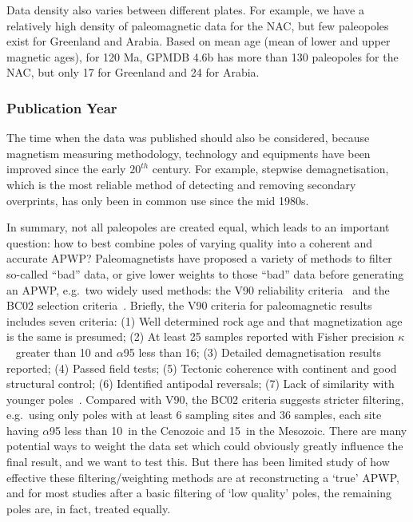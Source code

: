 Data density also varies between different plates. For example, we have a
relatively high density of paleomagnetic data for the NAC, but few paleopoles
exist for Greenland and Arabia. Based on mean age (mean of lower and upper
magnetic ages), for 120 Ma, GPMDB 4.6b has more than 130 paleopoles
for the NAC, but only 17 for Greenland and 24 for Arabia.

\subsubsection{Publication Year}\label{sec:puby}

The time when the data was published should also be considered, because
magnetism measuring methodology, technology and equipments have been improved
since the early $20^{th}$ century. For example, stepwise demagnetisation, which
is the most reliable method of detecting and removing secondary overprints, has
only been in common use since the mid 1980s.

In summary, not all paleopoles are created equal, which leads to an important
question: how to best combine poles of varying quality into a coherent and
accurate APWP\@? Paleomagnetists have proposed a variety of methods to filter
so-called ``bad'' data, or give lower weights to those ``bad'' data before
generating an APWP, e.g.\ two widely used methods: the V90 reliability
criteria~\citep{v90} and the BC02 selection criteria~\citep{B02}. Briefly, the
V90 criteria for paleomagnetic results includes seven criteria: (1) Well
determined rock age and that magnetization age is the same is presumed; (2) At
least 25 samples reported with Fisher precision $\kappa$~\citep{F53} greater
than 10 and $\alpha$95 less than 16\degree; (3) Detailed demagnetisation results
reported; (4) Passed field tests; (5) Tectonic coherence with continent and good
structural control; (6) Identified antipodal reversals; (7) Lack of similarity
with younger poles~\citep{T92}. Compared with V90, the BC02 criteria suggests
stricter filtering, e.g.\ using only poles with at least 6 sampling sites and 36
samples, each site having $\alpha$95 less than 10\degree\ in the Cenozoic and
15\degree\ in the Mesozoic. There are many potential ways to weight the data set
which could obviously greatly influence the final result, and we want to test
this. But there has been limited study of how effective these
filtering/weighting methods are at reconstructing a `true' APWP, and for most
studies after a basic filtering of `low quality' poles, the remaining poles are,
in fact, treated equally.

